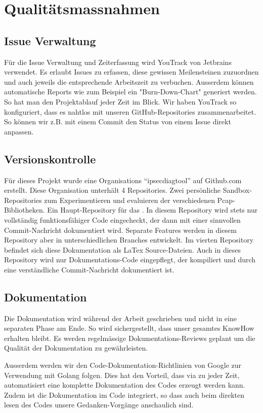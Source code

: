 \section{Qualitätsmassnahmen}
\label{sec:Qualitätsmassnahmen}

\subsection{Issue Verwaltung}
Für die Issue Verwaltung und Zeiterfassung wird YouTrack von Jetbrains verwendet. Es erlaubt Issues zu erfassen, diese gewissen Meilensteinen zuzuordnen und auch jeweils die entsprechende Arbeitszeit zu verbuchen. Ausserdem können automatische Reports wie zum Beispiel ein "Burn-Down-Chart" generiert werden. So hat man den Projektablauf jeder Zeit im Blick. Wir haben YouTrack so konfiguriert, dass es nahtlos mit unseren GitHub-Repositories zusammenarbeitet. So können wir z.B. mit einem Commit den Status von einem Issue direkt anpassen.

\subsection{Versionskontrolle}
Für dieses Projekt wurde eine Organisations \enquote{ipsecdiagtool} auf Github.com erstellt. Diese Organisation unterhält 4 Repositories. Zwei persönliche Sandbox-Repositories zum Experimentieren und evaluieren der verschiedenen Pcap-Bibliotheken. Ein Haupt-Repository für das \tool . In diesem Repository wird stets nur vollständig funktionsfähiger Code eingecheckt, der dann mit einer sinnvollen Commit-Nachricht dokumentiert wird. Separate Features werden in diesem Repository aber in unterschiedlichen Branches entwickelt.
Im vierten Repository befindet sich diese Dokumentation als LaTex Source-Dateien. Auch in dieses Repository wird nur Dokumentations-Code eingepflegt, der kompiliert und durch eine verständliche Commit-Nachricht dokumentiert ist.

\subsection{Dokumentation}
Die Dokumentation wird während der Arbeit geschrieben und nicht in eine separaten Phase am Ende. So wird sichergestellt, dass unser gesamtes KnowHow erhalten bleibt.
Es werden regelmässige Dokumentations-Reviews geplant um die Qualität der Dokumentation zu gewährleisten.

Ausserdem werden wir den Code-Dokumentation-Richtlinien von Google zur Verwendung mit Golang folgen. Dies hat den Vorteil, dass via  zu jeder Zeit, automatisiert eine komplette Dokumentation des Codes erzeugt werden kann. Zudem ist die Dokumentation im Code integriert, so dass auch beim direkten lesen des Codes unsere Gedanken-Vorgänge anschaulich sind.

